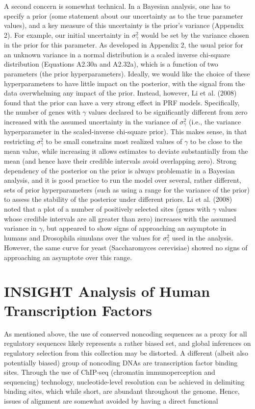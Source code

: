 \documentclass{article}
\begin{document}
A second concern is somewhat technical. In a Bayesian analysis, one has to specify a prior (some statement about our uncertainty as to the true parameter values), and a key measure of this uncertainty is the prior's variance (Appendix 2). For example, our initial uncertainty in  $ \sigma_{\gamma}^{2} $ would be set by the variance chosen in the prior for this parameter. As developed in Appendix 2, the usual prior for an unknown variance in a normal distribution is a scaled inverse chi-square distribution (Equations A2.30a and A2.32a), which is a function of two parameters (the prior hyperparameters). Ideally, we would like the choice of these hyperparameters to have little impact on the posterior, with the signal from the data overwhelming any impact of the prior. Instead, however, Li et al. (2008) found that the prior can have a very strong effect in PRF models. Specifically, the number of genes with  $ \gamma $ values declared to be significantly different from zero increased with the assumed uncertainty in the variance of  $ \sigma_{\gamma}^{2} $ (i.e., the variance hyperparameter in the scaled-inverse chi-square prior). This makes sense, in that restricting  $ \sigma_{\gamma}^{2} $ to be small constrains most realized values of  $ \gamma $ to be close to the mean value, while increasing it allows estimates to deviate substantially from the mean (and hence have their credible intervals avoid overlapping zero). Strong dependency of the posterior on the prior is always problematic in a Bayesian analysis, and it is good practice to run the model over several, rather different, sets of prior hyperparameters (such as using a range for the variance of the prior) to assess the stability of the posterior under different priors. Li et al. (2008) noted that a plot of a number of positively selected sites (genes with  $ \gamma $ values whose credible intervals are all greater than zero) increases with the assumed variance in  $ \gamma $, but appeared to show signs of approaching an asymptote in humans and Drosophila simulans over the values for  $ \sigma_{\gamma}^{2} $ used in the analysis. However, the same curve for yeast (Saccharomyces cerevisiae) showed no signs of approaching an asymptote over this range.

\section{INSIGHT Analysis of Human Transcription Factors}
As mentioned above, the use of conserved noncoding sequences as a proxy for all regulatory sequences likely represents a rather biased set, and global inferences on regulatory selection from this collection may be distorted. A different (albeit also potentially biased) group of noncoding DNAs are transcription factor binding sites. Through the use of ChIP-seq (chromatin immunoperception and sequencing) technology, nucleotide-level resolution can be achieved in delimiting binding sites, which while short, are abundant throughout the genome. Hence, issues of alignment are somewhat avoided by having a direct functional
\end{document}
